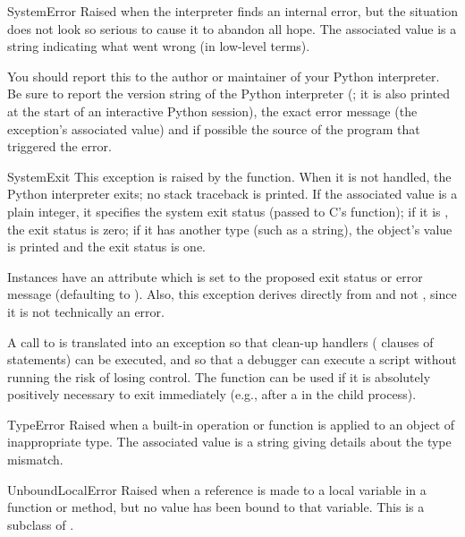 \begin{excdesc}{SystemError}
  Raised when the interpreter finds an internal error, but the
  situation does not look so serious to cause it to abandon all hope.
  The associated value is a string indicating what went wrong (in
  low-level terms).
  
  You should report this to the author or maintainer of your Python
  interpreter.  Be sure to report the version string of the Python
  interpreter (; it is also printed at the start of an
  interactive Python session), the exact error message (the exception's
  associated value) and if possible the source of the program that
  triggered the error.
\end{excdesc}

\begin{excdesc}{SystemExit}
  This exception is raised by the  function.  When it
  is not handled, the Python interpreter exits; no stack traceback is
  printed.  If the associated value is a plain integer, it specifies the
  system exit status (passed to C's  function); if it is
  , the exit status is zero; if it has another type (such as
  a string), the object's value is printed and the exit status is one.

  Instances have an attribute  which is set to the
  proposed exit status or error message (defaulting to ).
  Also, this exception derives directly from  and
  not , since it is not technically an error.

  A call to  is translated into an exception so that
  clean-up handlers ( clauses of  statements)
  can be executed, and so that a debugger can execute a script without
  running the risk of losing control.  The  function
  can be used if it is absolutely positively necessary to exit
  immediately (e.g., after a  in the child process).
\end{excdesc}

\begin{excdesc}{TypeError}
  Raised when a built-in operation or function is applied to an object
  of inappropriate type.  The associated value is a string giving
  details about the type mismatch.
\end{excdesc}

\begin{excdesc}{UnboundLocalError}
  Raised when a reference is made to a local variable in a function or
  method, but no value has been bound to that variable.  This is a
  subclass of .
\end{excdesc}

